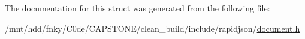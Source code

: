 The documentation for this struct was generated from the following file\+:\begin{DoxyCompactItemize}
\item 
/mnt/hdd/fnky/\+C0de/\+C\+A\+P\+S\+T\+O\+N\+E/clean\+\_\+build/include/rapidjson/\hyperlink{document_8h}{document.\+h}\end{DoxyCompactItemize}
